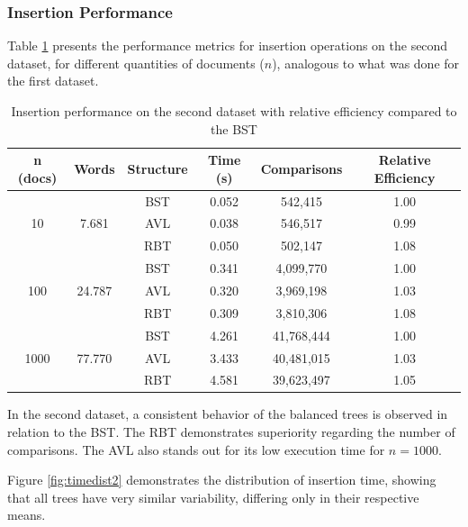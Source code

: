  \subsubsection{Insertion Performance}

 Table \ref{tab:insercao_db2} presents the performance metrics for insertion operations on the second dataset,
 for different quantities of documents ($n$), analogous to what was done for the first dataset.

 \begin{table}[H]
     \centering
     \begin{tabular}{|c|c|c|c|c|c|}
     \hline
     \textbf{n (docs)} & \textbf{Words} & \textbf{Structure} & \textbf{Time (s)} & \textbf{Comparisons} & \textbf{Relative Efficiency} \\
     \hline
     \multirow{3}{*}{10} & \multirow{3}{*}{7.681} & BST & 0.052 & 542,415 & 1.00 \\
     & & AVL & 0.038 & 546,517 & 0.99 \\
     & & RBT & 0.050 & 502,147 & 1.08 \\
     \hline
     \multirow{3}{*}{100} & \multirow{3}{*}{24.787} & BST & 0.341 & 4,099,770 & 1.00 \\
     & & AVL & 0.320 & 3,969,198 & 1.03 \\
     & & RBT & 0.309 & 3,810,306 & 1.08 \\
     \hline
     \multirow{3}{*}{1000} & \multirow{3}{*}{77.770} & BST & 4.261 & 41,768,444 & 1.00 \\
     & & AVL & 3.433 & 40,481,015 & 1.03 \\
     & & RBT & 4.581 & 39,623,497 & 1.05 \\
     \hline
     \end{tabular}
     \caption{Insertion performance on the second dataset with relative efficiency compared to the BST}
     \label{tab:insercao_db2}
 \end{table}


 In the second dataset, a consistent behavior of the balanced trees is observed in relation to the BST.
 The RBT demonstrates superiority regarding the number of comparisons. The AVL also stands out for its low execution
 time for $n = 1000$.

 Figure \ref{fig:timedist2} demonstrates the distribution of insertion time, showing that all trees 
 have very similar variability, differing only in their respective means.

